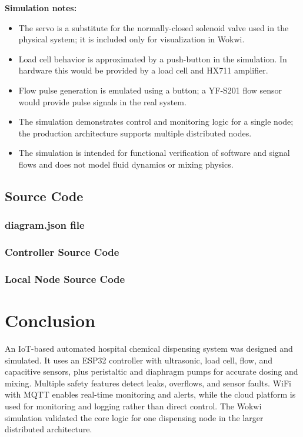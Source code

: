 \documentclass[12pt,a4paper]{report}
\begin{document}
\noindent\textbf{Simulation notes:}
\begin{itemize}
    \item The servo is a substitute for the normally-closed solenoid valve used in the physical system; it is included only for visualization in Wokwi.
    \item Load cell behavior is approximated by a push-button in the simulation. In hardware this would be provided by a load cell and HX711 amplifier.
    \item Flow pulse generation is emulated using a button; a YF‑S201 flow sensor would provide pulse signals in the real system.
    \item The simulation demonstrates control and monitoring logic for a single node; the production architecture supports multiple distributed nodes.
    \item The simulation is intended for functional verification of software and signal flows and does not model fluid dynamics or mixing physics.
\end{itemize}
\section{Source Code}

\subsection{diagram.json file}


\subsection{Controller Source Code}


\subsection{Local Node Source Code}



\chapter*{Conclusion}
An IoT-based automated hospital chemical dispensing system was designed and simulated. 
It uses an ESP32 controller with ultrasonic, load cell, flow, and capacitive sensors, plus peristaltic and diaphragm pumps for accurate dosing and mixing.
Multiple safety features detect leaks, overflows, and sensor faults.
WiFi with MQTT enables real-time monitoring and alerts, while the cloud platform is used for monitoring and logging rather than direct control.
The Wokwi simulation validated the core logic for one dispensing node in the larger distributed architecture.
\end{document}
